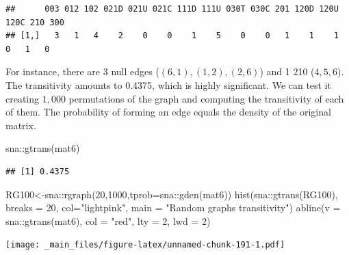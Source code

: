 \documentclass[
  notitlepage,
  onecolumn,
  openany]{book}
\newenvironment{Shaded}{\begin{snugshade}}{\end{snugshade}}
\newcommand{\AttributeTok}[1]{\textcolor[rgb]{0.77,0.63,0.00}{#1}}
\newcommand{\DecValTok}[1]{\textcolor[rgb]{0.00,0.00,0.81}{#1}}
\newcommand{\FunctionTok}[1]{\textcolor[rgb]{0.00,0.00,0.00}{#1}}
\newcommand{\NormalTok}[1]{#1}
\newcommand{\OtherTok}[1]{\textcolor[rgb]{0.56,0.35,0.01}{#1}}
\newcommand{\SpecialCharTok}[1]{\textcolor[rgb]{0.00,0.00,0.00}{#1}}
\newcommand{\StringTok}[1]{\textcolor[rgb]{0.31,0.60,0.02}{#1}}
\begin{document}
\begin{verbatim}
##      003 012 102 021D 021U 021C 111D 111U 030T 030C 201 120D 120U 120C 210 300
## [1,]   3   1   4    2    0    0    1    5    0    0   1    1    1    0   1   0
\end{verbatim}

For instance, there are 3 null edges (\((6,1), (1,2), (2,6)\)) and 1 210 (\(4,5,6\)). The transitivity amounts to 0.4375, which is highly significant. We can test it creating \(1,000\) permutations of the graph and computing the transitivity of each of them. The probability of forming an edge equals the density of the original matrix.

\begin{Shaded}
\begin{Highlighting}[]
\NormalTok{sna}\SpecialCharTok{::}\FunctionTok{gtrans}\NormalTok{(mat6)}
\end{Highlighting}
\end{Shaded}

\begin{verbatim}
## [1] 0.4375
\end{verbatim}

\begin{Shaded}
\begin{Highlighting}[]
\NormalTok{RG100}\OtherTok{\textless{}{-}}\NormalTok{sna}\SpecialCharTok{::}\FunctionTok{rgraph}\NormalTok{(}\DecValTok{20}\NormalTok{,}\DecValTok{1000}\NormalTok{,}\AttributeTok{tprob=}\NormalTok{sna}\SpecialCharTok{::}\FunctionTok{gden}\NormalTok{(mat6))}
\FunctionTok{hist}\NormalTok{(sna}\SpecialCharTok{::}\FunctionTok{gtrans}\NormalTok{(RG100), }\AttributeTok{breaks =} \DecValTok{20}\NormalTok{, }\AttributeTok{col=}\StringTok{"lightpink"}\NormalTok{,}
     \AttributeTok{main =} \StringTok{"Random graphs transitivity"}\NormalTok{)}
\FunctionTok{abline}\NormalTok{(}\AttributeTok{v =}\NormalTok{ sna}\SpecialCharTok{::}\FunctionTok{gtrans}\NormalTok{(mat6), }\AttributeTok{col =} \StringTok{"red"}\NormalTok{, }\AttributeTok{lty =} \DecValTok{2}\NormalTok{, }\AttributeTok{lwd =} \DecValTok{2}\NormalTok{)}
\end{Highlighting}
\end{Shaded}

\texttt{[image: \_main\_files/figure-latex/unnamed-chunk-191-1.pdf]}
\end{document}
